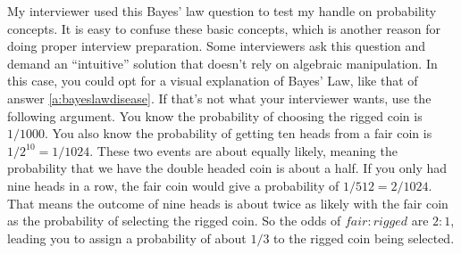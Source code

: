 \documentclass[11pt]{article}
\begin{document}
My interviewer used this Bayes' law question to test my handle on probability concepts.
It is easy to confuse these basic concepts, which is another reason for doing proper interview preparation.
Some interviewers ask this question and demand an ``intuitive'' solution that doesn't rely on algebraic manipulation.
In this case, you could opt for a visual explanation of Bayes' Law, like that of answer \ref{a:bayeslawdisease}.
If that's not what your interviewer wants, use the following argument.
You know the probability of choosing the rigged coin is $1/1000$.
You also know the probability of getting ten heads from a fair coin is $1/2^{10} = 1/1024$.
These two events are about equally likely, meaning the probability that we have the double headed coin is about a half.
If you only had nine heads in a row, the fair coin would give a probability of $1/512 = 2/1024$.
That means the outcome of nine heads is about twice as likely with the fair coin as the probability of selecting the rigged coin.
So the odds of ${fair}{:}{rigged}$ are $2{:}1$, leading you to assign a probability of about $1/3$ to the rigged coin being selected.




%
%
\end{document}

